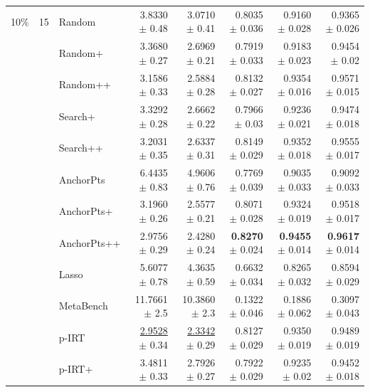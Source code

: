 \begin{longtable}{llp{}rrrrr}
10\% & 15 & Random & 3.8330 {\scriptsize $\pm$ 0.48} & 3.0710 {\scriptsize $\pm$ 0.41} & 0.8035 {\scriptsize $\pm$ 0.036} & 0.9160 {\scriptsize $\pm$ 0.028} & 0.9365 {\scriptsize $\pm$ 0.026} \\
 &  & Random+ & 3.3680 {\scriptsize $\pm$ 0.27} & 2.6969 {\scriptsize $\pm$ 0.21} & 0.7919 {\scriptsize $\pm$ 0.033} & 0.9183 {\scriptsize $\pm$ 0.023} & 0.9454 {\scriptsize $\pm$ 0.02} \\
 &  & Random++ & 3.1586 {\scriptsize $\pm$ 0.33} & 2.5884 {\scriptsize $\pm$ 0.28} & 0.8132 {\scriptsize $\pm$ 0.027} & 0.9354 {\scriptsize $\pm$ 0.016} & 0.9571 {\scriptsize $\pm$ 0.015} \\
 &  & Search+ & 3.3292 {\scriptsize $\pm$ 0.28} & 2.6662 {\scriptsize $\pm$ 0.22} & 0.7966 {\scriptsize $\pm$ 0.03} & 0.9236 {\scriptsize $\pm$ 0.021} & 0.9474 {\scriptsize $\pm$ 0.018} \\
 &  & Search++ & 3.2031 {\scriptsize $\pm$ 0.35} & 2.6337 {\scriptsize $\pm$ 0.31} & 0.8149 {\scriptsize $\pm$ 0.029} & 0.9352 {\scriptsize $\pm$ 0.018} & 0.9555 {\scriptsize $\pm$ 0.017} \\
 &  & AnchorPts & 6.4435 {\scriptsize $\pm$ 0.83} & 4.9606 {\scriptsize $\pm$ 0.76} & 0.7769 {\scriptsize $\pm$ 0.039} & 0.9035 {\scriptsize $\pm$ 0.033} & 0.9092 {\scriptsize $\pm$ 0.033} \\
 &  & AnchorPts+ & 3.1960 {\scriptsize $\pm$ 0.26} & 2.5577 {\scriptsize $\pm$ 0.21} & 0.8071 {\scriptsize $\pm$ 0.028} & 0.9324 {\scriptsize $\pm$ 0.019} & 0.9518 {\scriptsize $\pm$ 0.017} \\
 &  & AnchorPts++ & 2.9756 {\scriptsize $\pm$ 0.29} & 2.4280 {\scriptsize $\pm$ 0.24} & \textbf{0.8270} {\scriptsize $\pm$ 0.024} & \textbf{0.9455} {\scriptsize $\pm$ 0.014} & \textbf{0.9617} {\scriptsize $\pm$ 0.014} \\
 &  & Lasso & 5.6077 {\scriptsize $\pm$ 0.78} & 4.3635 {\scriptsize $\pm$ 0.59} & 0.6632 {\scriptsize $\pm$ 0.034} & 0.8265 {\scriptsize $\pm$ 0.032} & 0.8594 {\scriptsize $\pm$ 0.029} \\
 &  & MetaBench & 11.7661 {\scriptsize $\pm$ 2.5} & 10.3860 {\scriptsize $\pm$ 2.3} & 0.1322 {\scriptsize $\pm$ 0.046} & 0.1886 {\scriptsize $\pm$ 0.062} & 0.3097 {\scriptsize $\pm$ 0.043} \\
 &  & p-IRT & \underline{2.9528} {\scriptsize $\pm$ 0.34} & \underline{2.3342} {\scriptsize $\pm$ 0.29} & 0.8127 {\scriptsize $\pm$ 0.029} & 0.9350 {\scriptsize $\pm$ 0.019} & 0.9489 {\scriptsize $\pm$ 0.019} \\
 &  & p-IRT+ & 3.4811 {\scriptsize $\pm$ 0.33} & 2.7926 {\scriptsize $\pm$ 0.27} & 0.7922 {\scriptsize $\pm$ 0.029} & 0.9235 {\scriptsize $\pm$ 0.02} & 0.9452 {\scriptsize $\pm$ 0.018} \\

\end{longtable}
